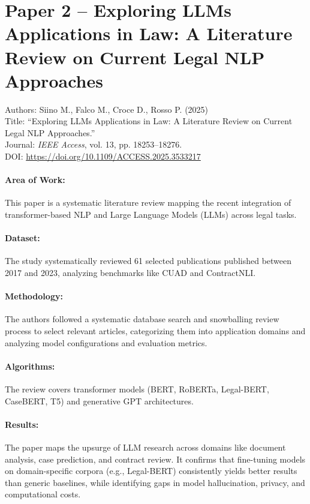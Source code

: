 \documentclass[12pt, a4paper]{report}
\begin{document}
\newpage

\section{Paper 2 -- Exploring LLMs Applications in Law: A Literature Review on Current Legal NLP Approaches}
\label{sec:paper2}

Authors: Siino M., Falco M., Croce D., Rosso P. (2025)\\
Title: ``Exploring LLMs Applications in Law: A Literature Review on Current Legal NLP Approaches.''\\
Journal: \textit{IEEE Access}, vol. 13, pp. 18253--18276.\\
DOI: \url{https://doi.org/10.1109/ACCESS.2025.3533217}

\paragraph{Area of Work:}
This paper is a systematic literature review mapping the recent integration of transformer-based NLP and Large Language Models (LLMs) across legal tasks.

\paragraph{Dataset:}
The study systematically reviewed 61 selected publications published between 2017 and 2023, analyzing benchmarks like CUAD and ContractNLI.

\paragraph{Methodology:}
The authors followed a systematic database search and snowballing review process to select relevant articles, categorizing them into application domains and analyzing model configurations and evaluation metrics.

\paragraph{Algorithms:}
The review covers transformer models (BERT, RoBERTa, Legal-BERT, CaseBERT, T5) and generative GPT architectures.

\paragraph{Results:}
The paper maps the upsurge of LLM research across domains like document analysis, case prediction, and contract review. It confirms that fine-tuning models on domain-specific corpora (e.g., Legal-BERT) consistently yields better results than generic baselines, while identifying gaps in model hallucination, privacy, and computational costs.
\end{document}
